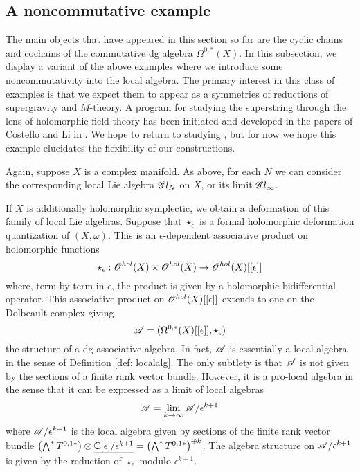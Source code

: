 
\subsection{A noncommutative example}


The main objects that have appeared in this section so far are the cyclic chains and cochains of the commutative dg algebra $\Omega^{0,*}(X)$. 
In this subsection, we display a variant of the above examples where we introduce some noncommutativity into the local algebra. 
The primary interest in this class of examples is that we expect them to appear as a symmetries of reductions of supergravity and $M$-theory. 
A program for studying the superstring through the lens of holomorphic field theory has been initiated and developed in the papers of Costello and Li in  \cite{...}.
We hope to return to studying , but for now we hope this example elucidates the flexibility of our constructions. 

Again, suppose $X$ is a complex manifold. 
As above, for each $N$ we can consider the corresponding local Lie algebra $\mathscr G l_N$ on $X$, or its limit $\mathscr G l_\infty$. 

If $X$ is additionally holomorphic symplectic, we obtain a deformation of this family of local Lie algebras. 
Suppose that $\star_\epsilon$ is a formal holomorphic deformation quantization of $(X,\omega)$. 
This is an $\epsilon$-dependent associative product on holomorphic functions 
\[
\star_\epsilon : \mathscr O^{hol}(X) \times \mathscr O^{hol}(X) \to \mathscr O^{hol}(X)[[\epsilon]]
\]
where, term-by-term in $\epsilon$, the product is given by a holomorphic bidifferential operator. 
This associative product on $\mathscr O^{hol}(X)[[\epsilon]]$ extends to one on the Dolbeault complex giving
\[
\mathscr A = (\Omega^{0,*}(X)[[\epsilon]], \star_{\epsilon})
\]
the structure of a dg associative algebra. 
In fact, $\mathscr A$ is essentially a local algebra in the sense of Definition \ref{def: localalg}. 
The only subtlety is that $\mathscr A$ is not given by the sections of a finite rank vector bundle.
However, it is a pro-local algebra in the sense that it can be expressed as a limit of local algebras
\[
\mathscr A = \lim_{k \to \infty} \mathscr A / \epsilon^{k+1} 
\] 
where $\mathscr A / \epsilon^{k+1}$ is the local algebra given by sections of the finite rank vector bundle $\left(\bigwedge^* T^{0,1*}\right) \otimes \underline{\mathbb C[\epsilon]/\epsilon^{k+1}} = \left(\bigwedge^* T^{0,1*}\right)^{\oplus k}$.
The algebra structure on $\mathscr A / \epsilon^{k+1}$ is given by the reduction of $\star_{\epsilon}$ modulo $\epsilon^{k+1}$. 

